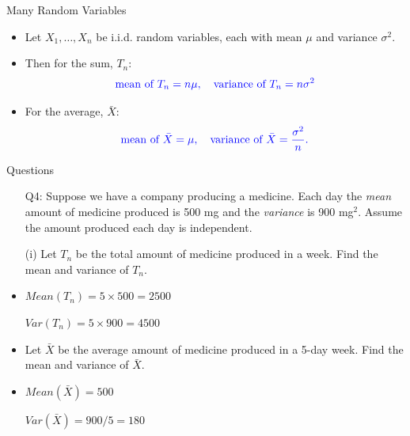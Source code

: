 \documentclass[10pt, handout, xcolor=table]{beamer}
\begin{document}
\begin{frame}{Many Random Variables}

\begin{itemize}
\setlength{\itemsep}{15pt}
\item Let $X_1, \dots, X_n$ be i.i.d. random variables, each with mean $\mu$ and variance $\sigma^2$.
\item Then for the sum, $T_n$:
$${\color{blue}\text{mean of }T_n = n\mu, \quad \text{variance of }T_n = n\sigma^2}$$
\item For the average, $\bar{X}$:
$${\color{blue} \text{mean of }\bar{X} = \mu, \quad \text{variance of } \bar{X} = \frac{\sigma^2}{n}.}$$
\end{itemize}

\end{frame}

\begin{frame}{Questions}
\begin{itemize}
\setlength{\itemsep}{15pt}
\item[Q4:] Suppose we have a company producing a medicine. Each day the \emph{mean} amount of medicine produced is 500 mg and the \emph{variance} is 900 mg$^2$. Assume the amount produced each day is independent.
\item[(i)] Let $T_n$ be the total amount of medicine produced in a week. Find the mean and variance of $T_n$. 
\item<2->[] {\color{red} $Mean(T_n) =   5\times 500 = 2500$}

 {\color{red} $Var(T_n) = 5\times 900 = 4500$}
\item<3->[(ii)] Let $\bar{X}$ be the average amount of medicine produced in a 5-day week. Find the mean and variance of $\bar{X}$.
\item<4->[] {\color{red} $Mean(\bar{X}) = 500$} 

{\color{red} $Var(\bar{X}) = 900/5 = 180$}
\end{itemize}
\end{frame}
\end{document}
